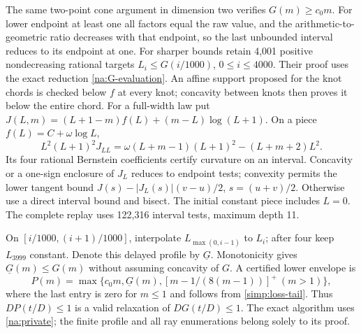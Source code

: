The same two-point cone argument in dimension two verifies $G(m)\ge c_0m$.
For lower endpoint at least one all factors equal the raw value, and the
arithmetic-to-geometric ratio decreases with that endpoint, so the last
unbounded interval reduces to its endpoint at one.
For sharper bounds retain 4,001 positive nondecreasing rational targets
$L_i\le G(i/1000)$, $0\le i\le4000$.
Their proof uses the exact reduction \eqref{na:G-evaluation}.
An affine support proposed for the knot chords is checked below $f$ at
every knot; concavity between knots then proves it below the entire chord.
For a full-width law put
$J(L,m)=(L+1-m)f(L)+(m-L)\log(L+1)$. On a piece
$f(L)=C+\omega\log L$,
\[
 L^2(L+1)^2J_{LL}
 =\omega(L+m-1)(L+1)^2-(L+m+2)L^2.
\]
Its four rational Bernstein coefficients certify curvature on an interval.
Concavity or a one-sign enclosure of $J_L$ reduces to endpoint tests;
convexity permits the lower tangent bound
$J(s)-|J_L(s)|(v-u)/2$, $s=(u+v)/2$. Otherwise use a direct interval
bound and bisect. The initial constant piece includes $L=0$.
The complete replay uses 122,316 interval tests, maximum depth 11.

On $[i/1000,(i+1)/1000]$, interpolate $L_{\max(0,i-1)}$ to $L_i$;
after four keep $L_{3999}$ constant. Denote this delayed profile by
$\underline G$. Monotonicity gives $\underline G(m)\le G(m)$ without
assuming concavity of $G$. A certified lower envelope is
\begin{equation}\label{fd:private-lower}
 P(m)=\max\{c_0m,\underline G(m),[m-1/(8(m-1))]^+\ (m>1)\},
\end{equation}
where the last entry is zero for $m\le1$ and follows from
\eqref{simp:loss-tail}. Thus $DP(t/D)\le1$ is a valid relaxation of
$DG(t/D)\le1$. The exact algorithm uses \eqref{na:private}; the finite
profile and all ray enumerations belong solely to its proof.
